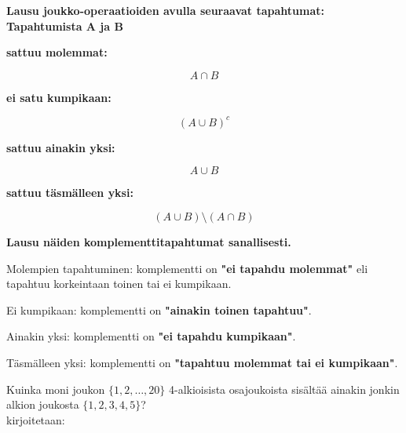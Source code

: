 \documentclass[12pt,a4paper]{article}
\begin{document}
\begin{kohta}
  \item \textbf{Lausu joukko-operaatioiden avulla seuraavat tapahtumat: Tapahtumista A ja B}

  \begin{alakohta}
    \item \textbf{sattuu molemmat:}
    
    \[
    A \cap B
    \]

    \item \textbf{ei satu kumpikaan:}
    
    \[
    (A \cup B)^c
    \]

    \item \textbf{sattuu ainakin yksi:}
    
    \[
    A \cup B
    \]

    \item \textbf{sattuu täsmälleen yksi:}
    
    \[
    (A \cup B) \setminus (A \cap B)
    \]
  \end{alakohta}

  \item \textbf{Lausu näiden komplementtitapahtumat sanallisesti.}

  \begin{alakohta}
    \item Molempien tapahtuminen: komplementti on \textbf{"ei tapahdu molemmat"}
    eli tapahtuu korkeintaan toinen tai ei kumpikaan.

    \item Ei kumpikaan: komplementti on \textbf{"ainakin toinen tapahtuu"}.

    \item Ainakin yksi: komplementti on \textbf{"ei tapahdu kumpikaan"}.

    \item Täsmälleen yksi: komplementti on \textbf{"tapahtuu molemmat tai ei kumpikaan"}.
  \end{alakohta}
\end{kohta}










\newpage
{}

Kuinka moni joukon $\{1,2,\ldots,20\}$ 4-alkioisista osajoukoista sisältää ainakin jonkin alkion joukosta $\{1, 2, 3, 4, 5\}$?\\

kirjoitetaan:
\end{document}
